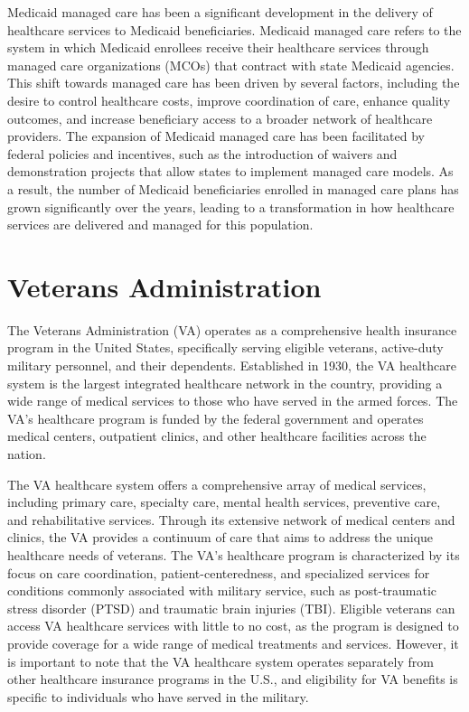 \documentclass[
  letterpaper,
  DIV=11,
  numbers=noendperiod]{scrreport}
\theoremstyle{definition}
\theoremstyle{remark}
\begin{document}
Medicaid managed care has been a significant development in the delivery
of healthcare services to Medicaid beneficiaries. Medicaid managed care
refers to the system in which Medicaid enrollees receive their
healthcare services through managed care organizations (MCOs) that
contract with state Medicaid agencies. This shift towards managed care
has been driven by several factors, including the desire to control
healthcare costs, improve coordination of care, enhance quality
outcomes, and increase beneficiary access to a broader network of
healthcare providers. The expansion of Medicaid managed care has been
facilitated by federal policies and incentives, such as the introduction
of waivers and demonstration projects that allow states to implement
managed care models. As a result, the number of Medicaid beneficiaries
enrolled in managed care plans has grown significantly over the years,
leading to a transformation in how healthcare services are delivered and
managed for this population.

\hypertarget{veterans-administration}{%
\section{Veterans Administration}\label{veterans-administration}}

The Veterans Administration (VA) operates as a comprehensive health
insurance program in the United States, specifically serving eligible
veterans, active-duty military personnel, and their dependents.
Established in 1930, the VA healthcare system is the largest integrated
healthcare network in the country, providing a wide range of medical
services to those who have served in the armed forces. The VA's
healthcare program is funded by the federal government and operates
medical centers, outpatient clinics, and other healthcare facilities
across the nation.

The VA healthcare system offers a comprehensive array of medical
services, including primary care, specialty care, mental health
services, preventive care, and rehabilitative services. Through its
extensive network of medical centers and clinics, the VA provides a
continuum of care that aims to address the unique healthcare needs of
veterans. The VA's healthcare program is characterized by its focus on
care coordination, patient-centeredness, and specialized services for
conditions commonly associated with military service, such as
post-traumatic stress disorder (PTSD) and traumatic brain injuries
(TBI). Eligible veterans can access VA healthcare services with little
to no cost, as the program is designed to provide coverage for a wide
range of medical treatments and services. However, it is important to
note that the VA healthcare system operates separately from other
healthcare insurance programs in the U.S., and eligibility for VA
benefits is specific to individuals who have served in the military.
\end{document}
